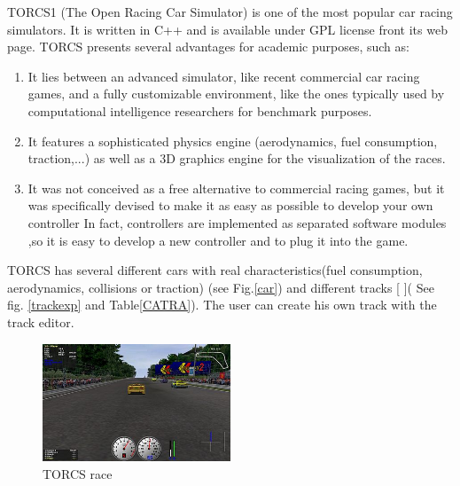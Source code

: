 \documentclass{llncs}
\begin{document}
TORCS1 (The Open Racing Car Simulator) is one of the most popular car racing simulators. It is written in C++ and
is available under GPL license front its web page. TORCS
presents several advantages for academic purposes, such as:
\begin{enumerate}
	
	\item  It lies between an advanced simulator, like recent commercial
	car racing games, and a fully customizable environment,
	like the ones typically used by computational
	intelligence researchers for benchmark purposes.
	\item  It features a sophisticated physics engine (aerodynamics,
	fuel consumption, traction,...) as well as a 3D graphics
	engine for the visualization of the races.
	\item  It was not conceived as a free alternative to commercial
	racing games, but it was specifically devised to make it
	as easy as possible to develop your own controller In fact, controllers are implemented as separated software
	modules ,so it is easy to develop a new controller and to plug
	it into the game.
	
\end{enumerate}

TORCS has several different cars with real characteristics(fuel consumption, aerodynamics, collisions or traction) (see Fig.\ref{car}) and different tracks [\cite{manuel} ]( See fig. \ref{trackexp} and Table\ref{CATRA}). The user can create his own track with the track editor.

\begin{figure}[h!]
	\centering
	\includegraphics[width=0.5\textwidth]{fig/TORCS1.png}
	\begin{minipage}{10cm}
		\centering
		
		\caption{\footnotesize TORCS race}
		\label{0301}
	\end{minipage} 
\end{figure}
\end{document}
